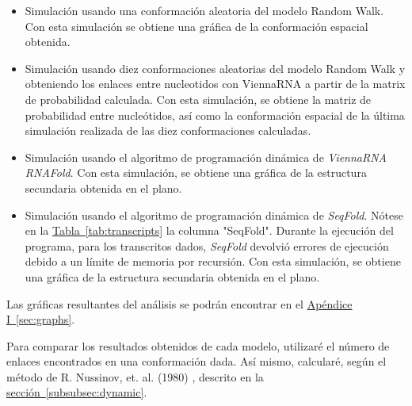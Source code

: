 \documentclass[a4paper,11pt,titlepage]{article}
\newcommand{\nr}[2][sección]{\hyperref[#2]{#1~\ref{#2}}}
\theoremstyle{definition}
\begin{document}
\begin{itemize}
    \item Simulación usando una conformación aleatoria del modelo Random Walk. Con esta simulación se obtiene una gráfica de la conformación espacial obtenida.
    \item Simulación usando diez conformaciones aleatorias del modelo Random Walk y obteniendo los enlaces entre nucleotidos con ViennaRNA a partir de la matrix de probabilidad calculada. Con esta simulación, se obtiene la matriz de probabilidad entre nucleótidos, así como la conformación espacial de la última simulación realizada de las diez conformaciones calculadas.
    \item Simulación usando el algoritmo de programación dinámica de \textit{ViennaRNA RNAFold}. Con esta simulación, se obtiene una gráfica de la estructura secundaria obtenida en el plano. 
    \item Simulación usando el algoritmo de programación dinámica de \textit{SeqFold}. Nótese en la \nr[Tabla]{tab:transcripts} la columna "SeqFold". Durante la ejecución del programa, para los transcritos dados, \textit{SeqFold} devolvió errores de ejecución debido a un límite de memoria por recursión. Con esta simulación, se obtiene una gráfica de la estructura secundaria obtenida en el plano. 
\end{itemize}


Las gráficas resultantes del análisis se podrán encontrar en el \nr[Apéndice I]{sec:graphs}.

Para comparar los resultados obtenidos de cada modelo, utilizaré el número de enlaces encontrados en una conformación dada. Así mismo, calcularé, según el método de R. Nussinov, et. al. (1980) \cite{nussinov}, descrito en la \nr[sección]{subsubsec:dynamic}.
\end{document}
